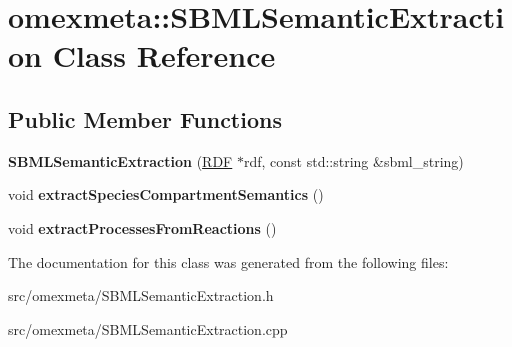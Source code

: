 \hypertarget{classomexmeta_1_1SBMLSemanticExtraction}{}\section{omexmeta\+:\+:S\+B\+M\+L\+Semantic\+Extraction Class Reference}
\label{classomexmeta_1_1SBMLSemanticExtraction}
\subsection*{Public Member Functions}
\begin{DoxyCompactItemize}
\item 
\mbox{\label{classomexmeta_1_1SBMLSemanticExtraction_a05d5e823362473907b93c2e360d068fb}} 
{\bfseries S\+B\+M\+L\+Semantic\+Extraction} (\hyperlink{classomexmeta_1_1RDF}{R\+DF} $\ast$rdf, const std\+::string \&sbml\+\_\+string)
\item 
\mbox{\label{classomexmeta_1_1SBMLSemanticExtraction_a53cda7f108b954af7fb1159773e44522}} 
void {\bfseries extract\+Species\+Compartment\+Semantics} ()
\item 
\mbox{\label{classomexmeta_1_1SBMLSemanticExtraction_a89ed78df066e71e628c8b631175a8441}} 
void {\bfseries extract\+Processes\+From\+Reactions} ()
\end{DoxyCompactItemize}


The documentation for this class was generated from the following files\+:\begin{DoxyCompactItemize}
\item 
src/omexmeta/S\+B\+M\+L\+Semantic\+Extraction.\+h\item 
src/omexmeta/S\+B\+M\+L\+Semantic\+Extraction.\+cpp\end{DoxyCompactItemize}
